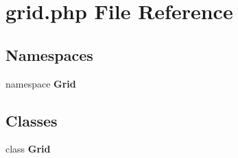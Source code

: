 \section{grid.php File Reference}
\label{test_2grid_8php}
\subsection*{Namespaces}
\begin{CompactItemize}
\item 
namespace {\bf Grid}
\end{CompactItemize}
\subsection*{Classes}
\begin{CompactItemize}
\item 
class {\bf Grid}
\end{CompactItemize}
